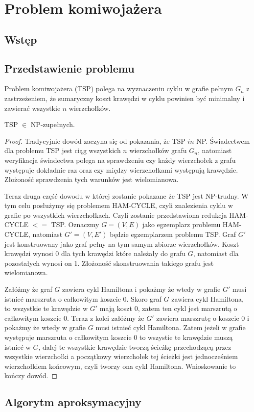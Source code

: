 \chapter{Problem komiwojażera}

\section{Wstęp}

\section{Przedstawienie problemu}

Problem komiwojażera (TSP) polega na wyznaczeniu cyklu w grafie pełnym $G_{n}$ z zastrzeżeniem, że sumaryczny koszt krawędzi w cyklu powinien być minimalny i zawierać wszystkie $n$ wierzchołków.  

\begin{twr}
TSP $\in$ NP-zupełnych.
\end{twr}


\begin{proof}

Tradycyjnie dowód zaczyna się od pokazania, że TSP $in$ NP. Świadectwem dla problemu TSP jest ciąg wszystkich $n$ wierzchołków grafu $G_{n}$, natomiast weryfikacja świadectwa polega na sprawdzeniu czy każdy wierzchołek z grafu występuje dokładnie raz oraz czy między wierzchołkami występują krawędzie. Złożoność sprawdzenia tych warunków jest wielomianowa.

Teraz druga część dowodu w której zostanie pokazane że TSP jest NP-trudny. W tym celu posłużymy się problemem HAM-CYCLE, czyli znalezienia cyklu w grafie po wszystkich wierzchołkach. Czyli zostanie przedstawiona redukcja HAM-CYCLE $<=$ TSP. Oznaczmy $G=(V,E)$ jako egzemplarz problemu  HAM-CYCLE, natomiast $G'=(V,E')$ będzie egzemplarzem problemu TSP. Graf $G'$ jest konstruowany jako graf pełny na tym samym zbiorze wierzchołków. Koszt krawędzi wynosi 0 dla tych krawędzi które należały do grafu $G$, natomiast dla pozostałych wynosi on 1. Złożoność skonstruowania takiego grafu jest wielomianowa.

Załóżmy że graf $G$ zawiera cykl Hamiltona i pokażmy że wtedy w grafie $G'$ musi istnieć marszruta o całkowitym koszcie 0. Skoro graf $G$ zawiera cykl Hamiltona, to wszystkie te krawędzie w $G'$ mają koszt 0, zatem ten cykl jest marszrutą o całkowitym koszcie 0.
Teraz z kolei załóżmy że $G'$ zawiera marszrutę o koszcie 0 i pokażmy że wtedy w grafie $G$ musi istnieć cykl Hamiltona. Zatem jeżeli w grafie występuje marszruta o całkowitym koszcie 0 to wszystie te krawędzie muszą istnieć w $G$, dalej te wszystkie krawędzie tworzą ścieżkę przechodzącą przez wszystkie wierzchołki a początkowy wierzchołek tej ścieżki jest jednocześniem wierzchołkiem końcowym, czyli tworzy ona cykl Hamiltona. Wnioskowanie to kończy dowód.

\end{proof}


\section{Algorytm aproksymacyjny}

